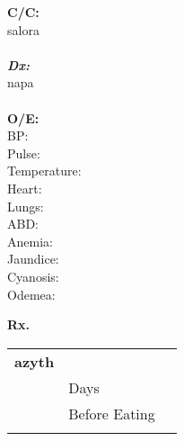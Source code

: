 \documentclass[12pt]{article}
\begin{document}
\begin{paracol}{2}

    \begin{tcolorbox}[blanker, breakable, width=\linewidth]
    {\fontsize{8}{14}

    \textbf{\large C/C:}
    \\
    salora
    \\ \\
    \textbf{\large\em Dx:}
    \\
    napa
    \\ \\
    \textbf{\large O/E:}
    \\
    BP:  \\
	Pulse: \\
	Temperature: \\
	Heart: \\
	Lungs: \\
	ABD: \\
	Anemia: \\
	Jaundice: \\
	Cyanosis: \\
	Odemea: \\
    }
    \end{tcolorbox}

    \setlength{\columnseprule}{0.4pt}
    \switchcolumn
    \begin{tcolorbox}[blanker, breakable, width=\linewidth]

    {\bf Rx.}
    \\
        \begin{supertabular}[l]{lll}
        \\
        
            {\bf azyth}  &  &  \\
                 & Days &   \\
                 & Before Eating \\
                    &             &         \\
            
        \end{supertabular}
    \end{tcolorbox}
\end{paracol}
\end{document}
